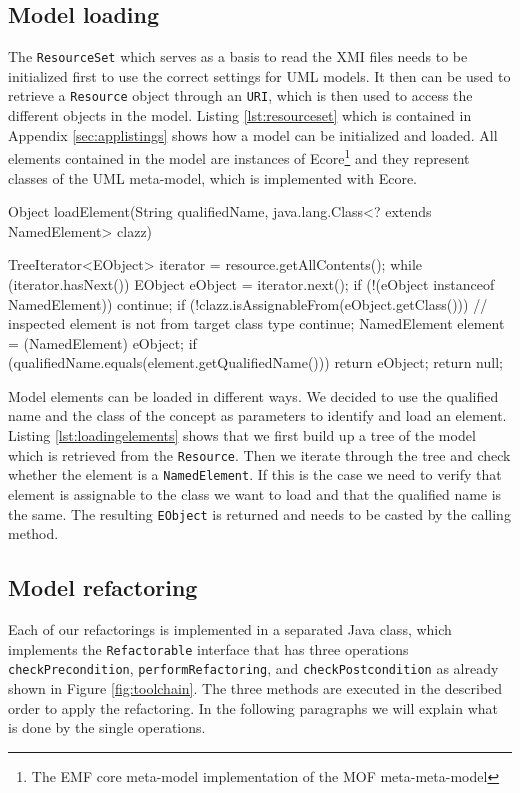 \documentclass{llncs}
\begin{document}
\subsection{Model loading}
The \texttt{Resource\-Set} which serves as a basis to read the XMI files needs to be 
initialized first to use the correct settings for UML models. It then can be used to retrieve a \texttt{Resource} object through 
an \texttt{URI}, which is then used to access the different objects in the model. Listing \ref{lst:resourceset} which is contained 
in Appendix \ref{sec:applistings} shows how a model can be initialized and loaded.
All elements contained in the model are instances of Ecore\footnote{The EMF core meta-model implementation of
the MOF meta-meta-model} and they represent classes of the UML meta-model, which is implemented with Ecore.

\begin{lstsingle}[language=Java,caption=Loading elements from the model,label=lst:loadingelements]
Object loadElement(String qualifiedName, 
  java.lang.Class<? extends NamedElement> clazz) {
  
  TreeIterator<EObject> iterator = 
    resource.getAllContents();
  while (iterator.hasNext()) {
    EObject eObject = iterator.next();
    if (!(eObject instanceof NamedElement)) {
      continue;
    }
    if (!clazz.isAssignableFrom(eObject.getClass())) {
      // inspected element is not from target class type
      continue;
    }
    NamedElement element = (NamedElement) eObject;
    if (qualifiedName.equals(element.getQualifiedName())) {
      return eObject;
    }
  }
  return null;
}
\end{lstsingle}

Model elements can be loaded in different ways. We decided to use the qualified name and the class of the concept as 
parameters to identify and load an element. Listing \ref{lst:loadingelements} shows that we first build up a tree of 
the model which is retrieved from the \texttt{Resource}. Then we iterate through the tree and check whether the element 
is a \texttt{NamedElement}. If this is the case we need to verify that element is assignable to the class we want to 
load and that the qualified name is the same. The resulting \texttt{EObject} is returned and needs to be casted by the 
calling method.

\subsection{Model refactoring}
Each of our refactorings is implemented in a separated Java class, which implements the \texttt{Refactorable}
interface that has three operations \texttt{check\-Precondition}, \texttt{perform\-Refactoring}, and \texttt{check\-Post\-condition} as 
already shown in Figure \ref{fig:toolchain}. The three methods are executed in the described order to apply the refactoring. 
In the following paragraphs we will explain what is done by the single operations.
\end{document}
